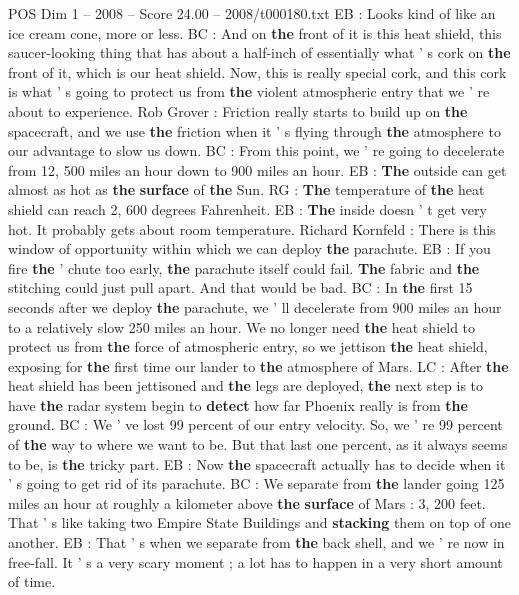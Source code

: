 \begin{textsample}{POS Dim 1 – 2008 – Score 24.00 – 2008/t000180.txt}
EB : Looks kind of like an ice cream cone, more or less.
BC : And on \textbf{the} front of it is this heat shield, this saucer-looking thing that has about a half-inch of essentially what ' s cork on \textbf{the} front of it, which is our heat shield.
Now, this is really special cork, and this cork is what ' s going to protect us from \textbf{the} violent atmospheric entry that we ' re about to experience.
Rob Grover : Friction really starts to build up on \textbf{the} spacecraft, and we use \textbf{the} friction when it ' s flying through \textbf{the} atmosphere to our advantage to slow us down.
BC : From this point, we ' re going to decelerate from 12, 500 miles an hour down to 900 miles an hour.
EB : \textbf{The} outside can get almost as hot as \textbf{the} \textbf{surface} of \textbf{the} Sun.
RG : \textbf{The} temperature of \textbf{the} heat shield can reach 2, 600 degrees Fahrenheit.
EB : \textbf{The} inside doesn ' t get very hot.
It probably gets about room temperature.
Richard Kornfeld : There is this window of opportunity within which we can deploy \textbf{the} parachute.
EB : If you fire \textbf{the} ' chute too early, \textbf{the} parachute itself could fail. \textbf{The} fabric and \textbf{the} stitching could just pull apart.
And that would be bad.
BC : In \textbf{the} first 15 seconds after we deploy \textbf{the} parachute, we ' ll decelerate from 900 miles an hour to a relatively slow 250 miles an hour.
We no longer need \textbf{the} heat shield to protect us from \textbf{the} force of atmospheric entry, so we jettison \textbf{the} heat shield, exposing for \textbf{the} first time our lander to \textbf{the} atmosphere of Mars.
LC : After \textbf{the} heat shield has been jettisoned and \textbf{the} legs are deployed, \textbf{the} next step is to have \textbf{the} radar system begin to \textbf{detect} how far Phoenix really is from \textbf{the} ground.
BC : We ' ve lost 99 percent of our entry velocity.
So, we ' re 99 percent of \textbf{the} way to where we want to be.
But that last one percent, as it always seems to be, is \textbf{the} tricky part.
EB : Now \textbf{the} spacecraft actually has to decide when it ' s going to get rid of its parachute.
BC : We separate from \textbf{the} lander going 125 miles an hour at roughly a kilometer above \textbf{the} \textbf{surface} of Mars : 3, 200 feet.
That ' s like taking two Empire State Buildings and \textbf{stacking} them on top of one another.
EB : That ' s when we separate from \textbf{the} back shell, and we ' re now in free-fall.
It ' s a very scary moment ; a lot has to happen in a very short amount of time.

\end{textsample}
